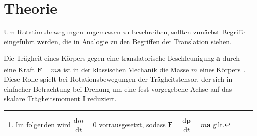 \section{Theorie}
\label{sec:Theorie}
Um Rotationsbewegungen angemessen zu beschreiben, sollten zunächst Begriffe
eingeführt werden, die in Analogie zu den Begriffen der Translation stehen.

Die Trägheit eines Körpers gegen eine translatorische Beschleunigung $\symbf{a}$
durch eine Kraft $\symbf{F}=m\symbf{a}$ ist in der klassischen Mechanik die
Masse $m$ eines Körpers\footnote{Im folgenden wird
$\dfrac{\mathrm{d}m}{\mathrm{d}t}=0$ vorrausgesetzt, sodass
$\symbf{F}=\dfrac{\mathrm{d}\symbf{p}}{\mathrm{d}t}=m\symbf{a}$ gilt.}.
Diese Rolle spielt bei Rotationsbewegungen der Trägheitstensor, der sich in
einfacher Betrachtung bei Drehung um eine fest vorgegebene Achse auf das skalare
Trägheitsmoment $\symbf{I}$ reduziert.
